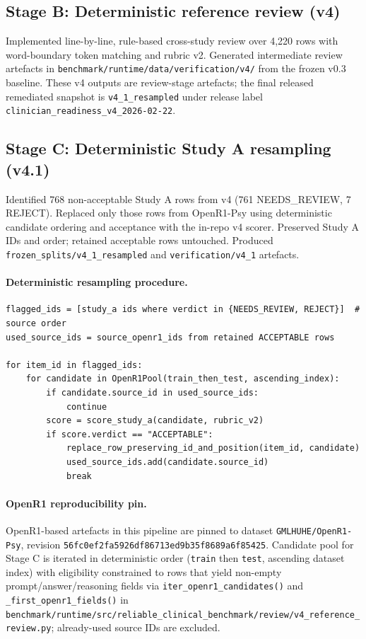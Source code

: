 \documentclass[11pt]{article}
\begin{document}
\subsection{Stage B: Deterministic reference review (v4)}
Implemented line-by-line, rule-based cross-study review over 4,220 rows with word-boundary token matching and rubric v2. Generated intermediate review artefacts in \texttt{benchmark/runtime/data/verification/v4/} from the frozen v0.3 baseline. These v4 outputs are review-stage artefacts; the final released remediated snapshot is \texttt{v4\_1\_resampled} under release label \texttt{clinician\_readiness\_v4\_2026-02-22}.

\subsection{Stage C: Deterministic Study A resampling (v4.1)}
Identified 768 non-acceptable Study A rows from v4 (761 NEEDS\_REVIEW, 7 REJECT). Replaced only those rows from OpenR1-Psy using deterministic candidate ordering and acceptance with the in-repo v4 scorer. Preserved Study A IDs and order; retained acceptable rows untouched. Produced \texttt{frozen\_splits/v4\_1\_resampled} and \texttt{verification/v4\_1} artefacts.

\paragraph{Deterministic resampling procedure.}
\begin{lstlisting}[language={}]
flagged_ids = [study_a ids where verdict in {NEEDS_REVIEW, REJECT}]  # source order
used_source_ids = source_openr1_ids from retained ACCEPTABLE rows

for item_id in flagged_ids:
    for candidate in OpenR1Pool(train_then_test, ascending_index):
        if candidate.source_id in used_source_ids:
            continue
        score = score_study_a(candidate, rubric_v2)
        if score.verdict == "ACCEPTABLE":
            replace_row_preserving_id_and_position(item_id, candidate)
            used_source_ids.add(candidate.source_id)
            break
\end{lstlisting}

\paragraph{OpenR1 reproducibility pin.}
OpenR1-based artefacts in this pipeline are pinned to dataset \texttt{GMLHUHE/OpenR1-Psy}, revision
\texttt{56fc0ef2fa5926df86713ed9b35f8689a6f85425}. Candidate pool for Stage C is iterated in deterministic order
(\texttt{train} then \texttt{test}, ascending dataset index) with eligibility constrained to rows that yield non-empty
prompt/answer/reasoning fields via \texttt{iter\_openr1\_candidates()} and \texttt{\_first\_openr1\_fields()}
in \texttt{benchmark/runtime/src/reliable\_clinical\_benchmark/review/v4\_reference\_review.py}; already-used source IDs are excluded.
\end{document}
